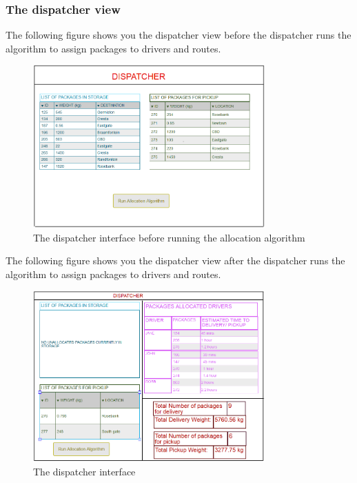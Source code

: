 \documentclass[paper=a4, fontsize=11pt]{scrartcl} %
\numberwithin{equation}{section} %
\numberwithin{figure}{section} %
\numberwithin{table}{section} %
\begin{document}
\subsubsection{The dispatcher view}
The following figure shows you the dispatcher view before the dispatcher runs the algorithm to assign packages to drivers and routes.
\begin{figure}[h!]
\centering
\includegraphics[width=3.5in]{pictures/dispatcherBefore.png}
\caption{The dispatcher interface before running the allocation algorithm}
\label{DispatcherBefore}
\end{figure}

The following figure shows you the dispatcher view after the dispatcher runs the algorithm to assign packages to drivers and routes.
\begin{figure}[h!]
\centering
\includegraphics[width=3.5in]{pictures/dispatcher.png}
\caption{The dispatcher interface}
\label{Dispatcher}
\end{figure}
\end{document}
